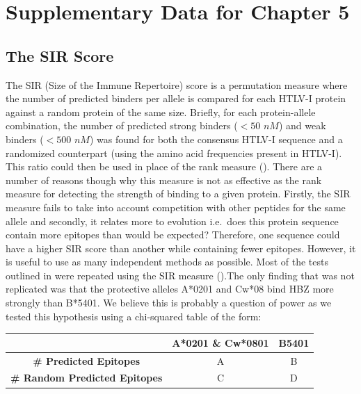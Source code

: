 
\chapter{Supplementary Data for Chapter 5}\label{AppendixC}

\section{The SIR Score}\label{appendixc/sir}

The SIR (Size of the Immune Repertoire) score \citep{Vider-Shalit2007} is a permutation measure where the number of predicted binders per allele is compared for each HTLV-I protein against a random protein of the same size. Briefly, for each protein-allele combination, the number of predicted strong binders ($< 50$ $nM$) and weak binders ($< 500$ $nM$) was found for both the consensus HTLV-I sequence and a randomized counterpart (using the amino acid frequencies present in HTLV-I). This ratio could then be used in place of the rank measure (). There are a number of reasons though why this measure is not as effective as the rank measure for detecting the strength of binding to a given protein. Firstly, the SIR measure fails to take into account competition with other peptides for the same allele and secondly, it relates more to evolution i.e.~does this protein sequence contain more epitopes than would be expected? Therefore, one sequence could have a higher SIR score than another while containing fewer epitopes. However, it is useful to use as many independent methods as possible. Most of the tests outlined in  were repeated using the SIR measure ().The only finding that was not replicated was that the protective alleles A*0201 and Cw*08 bind HBZ more strongly than B*5401. We believe this is probably a question of power as we tested this hypothesis using a chi-squared table of the form:

\begin{table}[htp]
\begin{center}
\begin{tabular}{|c|c|c|}
\hline
 & \textbf{A*0201 \& Cw*0801} & \textbf{B5401} \bigstrut \\
\hline
\textbf{\# Predicted Epitopes} & A & B \bigstrut[t] \\
\textbf{\# Random Predicted Epitopes} & C & D \bigstrut[b] \\
\hline
\end{tabular}
\end{center}
\end{table}

